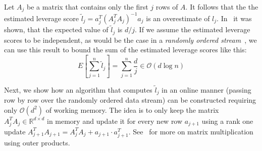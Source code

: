 Let $A_j$ be a matrix that contains only the first $j$ rows of $A$.
It follows that the the estimated leverage score
$\tilde{l}_j = a_j^T (A_j^TA_j)^{-1}a_j$ is an overestimate of $l_j$.
In~\cite{uniform-sampling-matrix} it was shown, that
the expected value of $\tilde{l}_j$ is $d / j$.
If we assume the estimated leverage scores to be independent, as would be
the case in a \textit{randomly ordered stream}~\cite{online-row-sampling},
we can use this result to bound the sum of the estimated leverage scores
like this:
\begin{equation*}
    E\left[ \sum_{j=1}^n \tilde{l}_j \right] = \sum_{j=1}^n \frac{d}{j}
    \in \mathcal{O}\left( d \log{n} \right)
\end{equation*}

Next, we show how an algorithm that computes $\tilde{l}_j$ in an
online manner (passing row by row over the randomly ordered data stream)
can be constructed requiring only $\mathcal{O}(d^2)$ of working memory.
The idea is to only keep the matrix $A_j^TA_j \in \mathbb{R}^{d \times d}$
in memory and update it
for every new row $a_{j+1}$ using a rank one update
$A_{j+1}^TA_{j+1} = A_j^TA_j + a_{j+1} \cdot a_{j+1}^T$.
See~\cite{matrix-computations} for more on matrix multiplication using
outer products.
